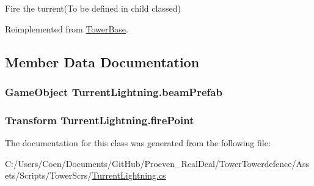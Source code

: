 Fire the turrent(\+To be defined in child classed) 



Reimplemented from \hyperlink{class_tower_base_a15cc4c8b977e8c43269c64a8013d6c0a}{Tower\+Base}.



\subsection{Member Data Documentation}
\subsubsection[{\texorpdfstring{beam\+Prefab}{beamPrefab}}]{\setlength{\rightskip}{0pt plus 5cm}Game\+Object Turrent\+Lightning.\+beam\+Prefab}\hypertarget{class_turrent_lightning_a44d84d797d730f0d7780d9b3244b15a8}{}\label{class_turrent_lightning_a44d84d797d730f0d7780d9b3244b15a8}
\subsubsection[{\texorpdfstring{fire\+Point}{firePoint}}]{\setlength{\rightskip}{0pt plus 5cm}Transform Turrent\+Lightning.\+fire\+Point}\hypertarget{class_turrent_lightning_a3c49d65af9d1373796ac1230315f84d6}{}\label{class_turrent_lightning_a3c49d65af9d1373796ac1230315f84d6}


The documentation for this class was generated from the following file\+:\begin{DoxyCompactItemize}
\item 
C\+:/\+Users/\+Coen/\+Documents/\+Git\+Hub/\+Proeven\+\_\+\+Real\+Deal/\+Tower\+Towerdefence/\+Assets/\+Scripts/\+Tower\+Scr\textquotesingle{}s/\hyperlink{_turrent_lightning_8cs}{Turrent\+Lightning.\+cs}\end{DoxyCompactItemize}
